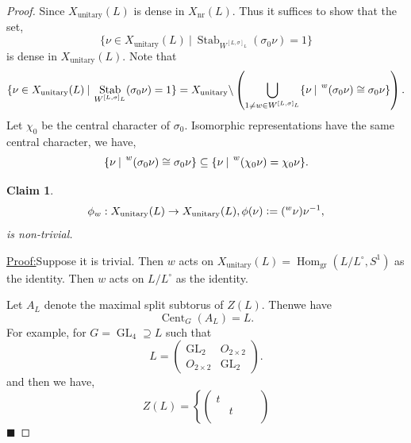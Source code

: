 \documentclass[8pt]{article}
\newtheorem{claim}{Claim}
\newenvironment{claimproof}[1]{\par\noindent\underline{Proof:}\space#1}{\hfill $\blacksquare$}
\DeclareMathOperator{\Stab}{Stab}
\DeclareMathOperator{\unitary}{unitary}
\DeclareMathOperator{\GL}{GL}
\DeclareMathOperator{\Hom}{Hom}
\DeclareMathOperator{\gr}{gr}
\DeclareMathOperator{\Cent}{Cent}
\DeclareMathOperator{\nr}{nr}
\newcommand{\defeq}{\vcentcolon=}
\newcommand{\sep}[0]{\:|\:}
\begin{document}
\begin{proof}
  Since $X_{\unitary}(L)$ is dense in $X_{\nr}(L)$. Thus it suffices to show that the set,
  \begin{equation*}
    \{\nu\in X_{\unitary}(L)\sep \Stab_{W^{[L,\sigma]_L}}(\sigma_0\nu)=1\}
  \end{equation*}
  is dense in $X_{\unitary}(L)$. Note that 
  \begin{equation*}
    \{\nu\in X_{\unitary}(L)\sep \Stab_{W^{[L,\sigma]_L}}(\sigma_0\nu)=1\} = X_{\unitary}\backslash\left(\bigcup_{1\not=w\in W^{[L,\sigma]_L}}\{\nu\sep \prescript{w}{}{(\sigma_0\nu)}\cong \sigma_0\nu\}\right).
  \end{equation*}
  Let $\chi_0$ be the central character of $\sigma_0$. Isomorphic representations have the same central character, we have,
  \begin{equation*}
    \{\nu\sep \prescript{w}{}{(\sigma_0\nu)}\cong \sigma_0\nu\}\subseteq\{\nu\sep \prescript{w}{}{(\chi_0\nu)}=\chi_0\nu\}.
  \end{equation*}
  \begin{claim}
      \begin{equation*}
        \phi_w:X_{\unitary}(L)\to X_{\unitary}(L), \phi(\nu) \defeq (\prescript{w}{}{\nu})\nu^{-1},
      \end{equation*}
      is non-trivial.
    \end{claim}
    \begin{claimproof}
      Suppose it is trivial. Then $w$ acts on $X_{\unitary}(L) = \Hom_{\gr}(L/L^\circ,S^1)$ as the identity.
      Then $w$ acts on $L/L^\circ$ as the identity. 
      \par Let $A_L$ denote the maximal split subtorus of $Z(L)$. Thenwe have 
      \begin{equation*}
        \Cent_G(A_L)=L.
      \end{equation*}
      For example, for $G=\GL_4\supseteq L$ such that 
      \begin{equation*}
      L = \begin{pmatrix}
        \GL_2&O_{2\times 2}\\
        O_{2\times 2} & \GL_2
      \end{pmatrix}.
      \end{equation*}
      and then we have,
      \begin{equation*}
        Z(L) = \left\{\begin{pmatrix}
          t& \: & \: &\: \\
          \: & t & \: & \:\\

\end{pmatrix}
\end{equation*}
\end{claimproof}
\end{proof}
\end{document}

